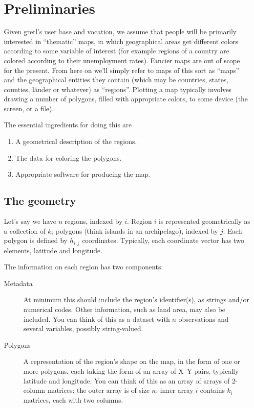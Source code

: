 \documentclass{article}
\begin{document}
\section{Preliminaries}
\label{sec:prelim}

Given gretl's user base and vocation, we assume that people will be
primarily interested in ``thematic'' maps, in which geographical areas
get different colors according to some variable of interest (for
example regions of a country are colored according to their
unemployment rates). Fancier maps are out of scope for the
present. From here on we'll simply refer to maps of this sort as
``maps'' and the geographical entities they contain (which may be
countries, states, counties, l\"ander or whatever) as
``regions''. Plotting a map typically involves drawing a number of
polygons, filled with appropriate colors, to some device (the screen,
or a file).

The essential ingredients for doing this are
\begin{enumerate}
   \item A geometrical description of the regions.
   \item The data for coloring the polygons.
   \item Appropriate software for producing the map.
\end{enumerate}

\subsection{The geometry}
\label{sec:geometry}

Let's say we have $n$ regions, indexed by $i$. Region $i$ is
represented geometrically as a collection of $k_i$ polygons (think
islands in an archipelago), indexed by $j$. Each polygon is defined by
$h_{i,j}$ coordinates. Typically, each coordinate vector has two
elements, latitude and longitude.

The information on each region has two components:
\begin{description}
\item[Metadata] At minimum this should include the region's
  identifier(s), as strings and/or numerical codes. Other information,
  such as land area, may also be included. You can think of this as a
  dataset with $n$ observations and several variables, possibly
  string-valued.
\item[Polygons] A representation of the region's shape on the map, in
  the form of one or more polygons, each taking the form of an array
  of X--Y pairs, typically latitude and longitude. You can think of
  this as an array of arrays of 2-column matrices: the outer array is
  of size $n$; inner array $i$ contains $k_i$ matrices, each with two
  columns.
\end{description}
\end{document}
